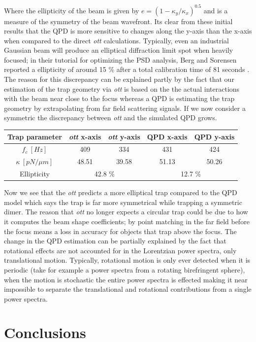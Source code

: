 Where the ellipticity of the beam is given by $e = (1-\kappa_y/\kappa_x)^{0.5}$ and is a measure of the symmetry of 
the beam wavefront. Its clear from these initial results that the 
QPD is more sensitive to changes along the y-axis than the x-axis 
when compared to the direct \textit{ott} calculations. Typically,
even an industrial Gaussian beam will produce an elliptical diffraction
limit spot when heavily focused; in their tutorial for optimizing 
the PSD analysis, Berg and Sorensen reported a ellipticity of
around 15 \% after a total calibration time of 81 seconds \cite{BergSoerensen2004}. The reason for this discrepancy
can be explained partly by the fact that our estimation of the 
trap geometry via \textit{ott} is based on the the actual 
interactions with the beam near close to the focus whereas
a QPD is estimating the trap geometry by extrapolating from
far field scattering signals. If we now consider a symmetric the 
discrepancy between \textit{ott} and the simulated QPD grows.

\begin{center}
	\begin{tabular}{ |c|c|c|c|c| } 
		\hline
		Trap parameter & \textit{ott} x-axis & \textit{ott} y-axis & QPD x-axis & QPD y-axis \\
		\hline
		$f_c\ [Hz]$ & 409 & 334 & 431 & 424 \\
		$\kappa\ [pN/\mu m]$ & 48.51 & 39.58 & 51.13 & 50.26 \\
		\hline
		Ellipticity &
		\multicolumn{2}{|c|}{42.8 \%} &
		\multicolumn{2}{|c|}{12.7 \%} \\
		\hline
	\end{tabular}
\end{center}

Now we see that the \textit{ott} predicts a more elliptical 
trap compared to the QPD model which says the trap is far
more symmetrical while trapping a symmetric dimer. The reason that
\textit{ott} no longer expects a circular trap could be due to
how it computes the beam shape coefficients; by point matching in 
the far field before the focus means a loss in accuracy for objects
that trap above the focus. The change in the QPD estimation  
can be partially explained by the fact that rotational
effects are not accounted for in the Lorentzian power spectra,
only translational motion. Typically, rotational motion is only
ever detected when it is periodic (take for example a power spectra
from a rotating birefringent sphere), when the motion is stochastic
the entire power spectra is effected making it near impossible
to separate the translational and rotational contributions from a 
single power spectra. 


\section{Conclusions}
